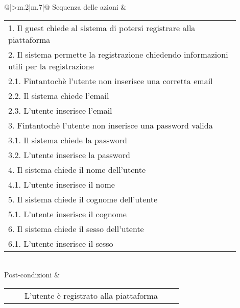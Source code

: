 \begin{table}[H]
\begin{longtable}{@{}|>{\centering\arraybackslash}m{.2\textwidth}|m{.7\textwidth}|@{}}
		Sequenza delle azioni & \begin{tabular}{m{0.9\linewidth}}\hspace{0.0cm}1. Il guest chiede al sistema di potersi registrare alla piattaforma\\\hspace{0.0cm}2. Il sistema permette la registrazione chiedendo informazioni utili per la registrazione\\\hspace{0.5cm}\hspace{0.0cm}2.1. Fintantochè l'utente non inserisce una corretta email\\\hspace{0.5cm}\hspace{0.0cm}2.2. Il sistema chiede l'email\\\hspace{0.5cm}\hspace{0.0cm}2.3. L'utente inserisce l'email\\\hspace{0.0cm}3. Fintantochè l'utente non inserisce una password valida\\\hspace{0.5cm}\hspace{0.0cm}3.1. Il sistema chiede la password\\\hspace{0.5cm}\hspace{0.0cm}3.2. L'utente inserisce la password\\\hspace{0.0cm}4. Il sistema chiede il nome dell'utente\\\hspace{0.5cm}\hspace{0.0cm}4.1. L'utente inserisce il nome\\\hspace{0.0cm}5. Il sistema chiede il cognome dell'utente\\\hspace{0.5cm}\hspace{0.0cm}5.1. L'utente inserisce il cognome\\\hspace{0.0cm}6. Il sistema chiede il sesso dell'utente\\\hspace{0.5cm}\hspace{0.0cm}6.1. L'utente inserisce il sesso\\\end{tabular}\\
		Post-condizioni & \begin{tabular}{m{0.9\linewidth}}~~\llap{\textbullet}~~L'utente è registrato alla piattaforma\\\end{tabular}\\

\end{longtable}
\end{table}
